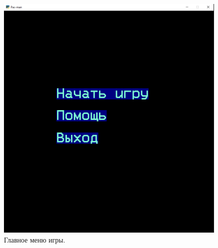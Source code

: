 \documentclass[14pt, oneside]{altsu-report}
\begin{document}
\begin{code}
	\label{code:ghost}
	\inputminted[mathescape,linenos,frame=lines,fontsize=\tiny,breaklines]{Python}{src/ghost.py}
\end{code}

\begin{figure}[H]
	\centering
	\includegraphics[width=1\linewidth]{images/1.png}
	\caption{Главное меню игры.}
	\label{fig2}
\end{figure}
\end{document}
